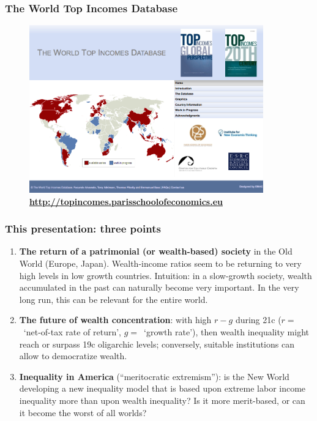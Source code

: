 \begin{frame}[label=WTID]
\frametitle{The World Top Incomes Database}
\begin{figure}[t]
\begin{minipage}[b]{\textwidth}
\centering
\includegraphics[width=0.9\textwidth]
{pictures/WorldTopIncomesDatabase}
\caption{\textbf{\url{http://topincomes.parisschoolofeconomics.eu}}}
\end{minipage}
\end{figure}
\end{frame}


\begin{frame}[label=ThreePoints,fragile,shrink=4]
\frametitle{This presentation: three points}
\begin{enumerate}
\item
\textbf{The return of a patrimonial (or wealth-based) society} in the Old World (Europe, Japan). Wealth-income ratios seem to be returning to very high levels in low growth countries.
\medskip\newline
Intuition: in a slow-growth society, wealth accumulated in the past can naturally become very important. In the very long run, this can be relevant for the entire world.
\item 
\textbf{The future of wealth concentration}: with high $r-g$ during 21c ($r =$~`net-of-tax rate of return', $g =$~`growth rate'), then wealth inequality might reach or surpass 19c oligarchic levels; conversely, suitable institutions can allow to democratize wealth.
\item
\textbf{Inequality in America} (``meritocratic extremism''): is the New World developing a new inequality model that is based upon extreme labor income inequality more than upon wealth inequality? Is it more merit-based, or can it become the worst of all worlds?
\end{enumerate}
\end{frame}


